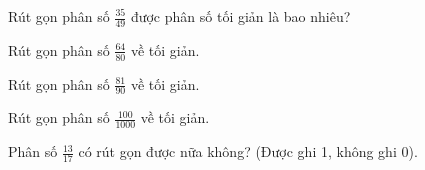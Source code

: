 \begin{ex}
Rút gọn phân số $\frac{35}{49}$ được phân số tối giản là bao nhiêu?
\end{ex}

\begin{ex}
Rút gọn phân số $\frac{64}{80}$ về tối giản.
\end{ex}

\begin{ex}
Rút gọn phân số $\frac{81}{90}$ về tối giản.
\end{ex}

\begin{ex}
Rút gọn phân số $\frac{100}{1000}$ về tối giản.
\end{ex}

\begin{ex}
Phân số $\frac{13}{17}$ có rút gọn được nữa không? (Được ghi 1, không ghi 0).
\end{ex}
